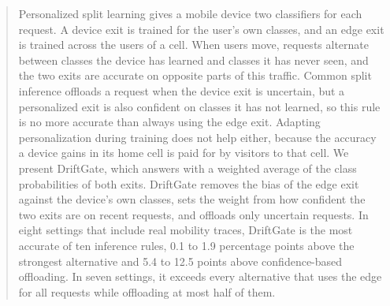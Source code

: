 \begin{abstract}
Personalized split learning gives a mobile device two classifiers for each request. A device exit is trained for the user's own classes, and an edge exit is trained across the users of a cell. When users move, requests alternate between classes the device has learned and classes it has never seen, and the two exits are accurate on opposite parts of this traffic. Common split inference offloads a request when the device exit is uncertain, but a personalized exit is also confident on classes it has not learned, so this rule is no more accurate than always using the edge exit. Adapting personalization during training does not help either, because the accuracy a device gains in its home cell is paid for by visitors to that cell. We present DriftGate, which answers with a weighted average of the class probabilities of both exits. DriftGate removes the bias of the edge exit against the device's own classes, sets the weight from how confident the two exits are on recent requests, and offloads only uncertain requests. In eight settings that include real mobility traces, DriftGate is the most accurate of ten inference rules, 0.1 to 1.9 percentage points above the strongest alternative and 5.4 to 12.5 points above confidence-based offloading. In seven settings, it exceeds every alternative that uses the edge for all requests while offloading at most half of them. 
\end{abstract}
